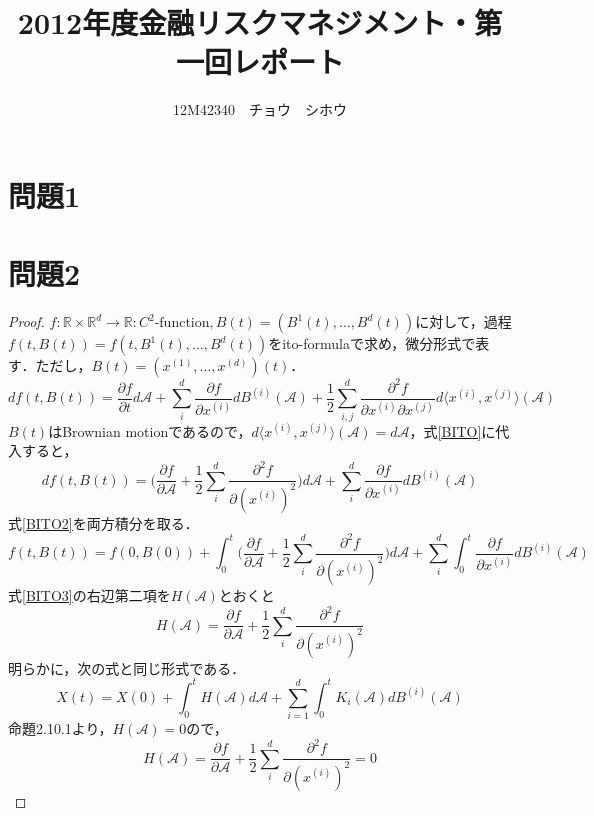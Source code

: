 \documentclass[a4paper,11pt]{jsarticle}
\title{2012年度金融リスクマネジメント・第一回レポート}
\author{12M42340　チョウ　シホウ}
\date{}
\numberwithin{theorem}{section}  %
\numberwithin{equation}{section} %
\begin{document}
{}
\renewcommand{\thepart}{\arabic{part}}

\maketitle

\section{問題1}
\section{問題2}
\begin{proof}
$f:\mathbb{R}\times\mathbb{R}^d \to \mathbb{R}:C^2\text{-function},B(t)=(B^1(t),\dots,B^d(t))$に対して，過程$f(t,B(t))=f(t,B^1(t),\dots,B^d(t))$をito-formulaで求め，微分形式で表す．ただし，$B(t)=(x^{(1)},\dots,x^{(d)})(t)$．
\begin{equation}
df(t,B(t)) = \frac{\partial f}{\partial t} d\mathcal{A} + \sum_{i}^d \frac{\partial f}{\partial x^{(i)}} d B^{(i)}(\mathcal{A}) + \frac{1}{2}\sum_{i,j}^d \frac{\partial^2 f}{\partial x^{(i)} \partial x^{(j)}} d \langle x^{(i)}, x^{(j)}\rangle (\mathcal{A})
\label{BITO}
\end{equation}
$B(t)$はBrownian motionであるので，$d \langle x^{(i)}, x^{(j)}\rangle (\mathcal{A}) = d\mathcal{A}$，式\eqref{BITO}に代入すると，
\begin{equation}
df(t,B(t)) = \Bigr( \frac{\partial f}{\partial \mathcal{A}}+ \frac{1}{2}\sum_{i}^d \frac{\partial^2 f}{\partial (x^{(i)})^2} \Bigr)d\mathcal{A} +  \sum_{i}^d \frac{\partial f}{\partial x^{(i)}} d B^{(i)}(\mathcal{A})
\label{BITO2}
\end{equation}
式\eqref{BITO2}を両方積分を取る．
\begin{equation}
f(t,B(t)) = f(0,B(0)) + \int_0^t \Bigr( \frac{\partial f}{\partial \mathcal{A}}+ \frac{1}{2}\sum_{i}^d \frac{\partial^2 f}{\partial (x^{(i)})^2} \Bigr)d\mathcal{A} + \sum_{i}^d \int_0^t  \frac{\partial f}{\partial x^{(i)}} d B^{(i)}(\mathcal{A})
\label{BITO3}
\end{equation}
式\ref{BITO3}の右辺第二項を$H(\mathcal{A})$とおくと
\begin{equation}
H(\mathcal{A}) = \frac{\partial f}{\partial \mathcal{A}}+ \frac{1}{2}\sum_{i}^d \frac{\partial^2 f}{\partial (x^{(i)})^2}
\end{equation}
明らかに，次の式と同じ形式である．
\begin{equation}
X(t) = X(0) + \int_0^t H(\mathcal{A})d\mathcal{A} + \sum_{i=1}^d \int_0^t K_i(\mathcal{A})dB^{(i)}(\mathcal{A})
\end{equation}
命題2.10.1より，$H(\mathcal{A})=0$ので，
\begin{equation}
H(\mathcal{A}) = \frac{\partial f}{\partial \mathcal{A}}+ \frac{1}{2}\sum_{i}^d \frac{\partial^2 f}{\partial (x^{(i)})^2} = 0
\end{equation}
\end{proof}
\end{document}
